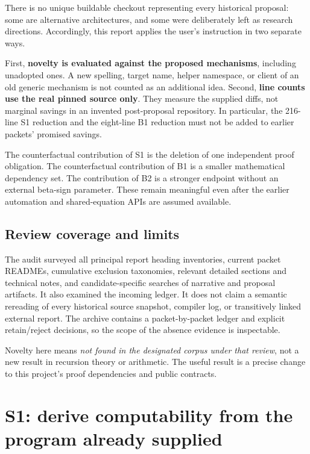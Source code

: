 \documentclass[10pt,a4paper]{article}
\begin{document}
There is no unique buildable checkout representing every historical proposal: some are alternative architectures, and some were deliberately left as research directions. Accordingly, this report applies the user's instruction in two separate ways.

First, \textbf{novelty is evaluated against the proposed mechanisms}, including unadopted ones. A new spelling, target name, helper namespace, or client of an old generic mechanism is not counted as an additional idea. Second, \textbf{line counts use the real pinned source only}. They measure the supplied diffs, not marginal savings in an invented post-proposal repository. In particular, the 216-line S1 reduction and the eight-line B1 reduction must not be added to earlier packets' promised savings.

The counterfactual contribution of S1 is the deletion of one independent proof obligation. The counterfactual contribution of B1 is a smaller mathematical dependency set. The contribution of B2 is a stronger endpoint without an external beta-sign parameter. These remain meaningful even after the earlier automation and shared-equation APIs are assumed available.

\subsection{Review coverage and limits}

The audit surveyed all principal report heading inventories, current packet READMEs, cumulative exclusion taxonomies, relevant detailed sections and technical notes, and candidate-specific searches of narrative and proposal artifacts. It also examined the incoming ledger. It does not claim a semantic rereading of every historical source snapshot, compiler log, or transitively linked external report. The archive contains a packet-by-packet ledger and explicit retain/reject decisions, so the scope of the absence evidence is inspectable.

Novelty here means \emph{not found in the designated corpus under that review}, not a new result in recursion theory or arithmetic. The useful result is a precise change to this project's proof dependencies and public contracts.

\section{S1: derive computability from the program already supplied}
\end{document}
